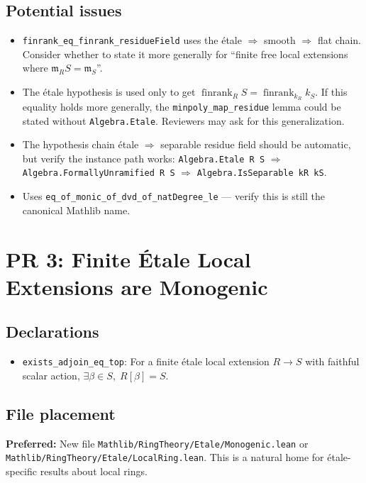 \subsection*{Potential issues}
\begin{itemize}
  \item \texttt{finrank\_eq\_finrank\_residueField} uses the étale
    $\Rightarrow$ smooth $\Rightarrow$ flat chain. Consider whether to state it more generally for
    ``finite free local extensions where $\mathfrak{m}_R S = \mathfrak{m}_S$''.
  \item The étale hypothesis is used only to get
    $\operatorname{finrank}_R S = \operatorname{finrank}_{k_R} k_S$.
    If this equality holds more generally, the \texttt{minpoly\_map\_residue} lemma
    could be stated without \texttt{Algebra.Etale}. Reviewers may ask for
    this generalization.
  \item The hypothesis chain étale $\Rightarrow$ separable residue field
    should be automatic, but verify the instance path works:
    \texttt{Algebra.Etale R S} $\Rightarrow$
    \texttt{Algebra.FormallyUnramified R S} $\Rightarrow$
    \texttt{Algebra.IsSeparable kR kS}.
  \item Uses \texttt{eq\_of\_monic\_of\_dvd\_of\_natDegree\_le} --- verify
    this is still the canonical Mathlib name.
\end{itemize}


\section{PR 3: Finite \'Etale Local Extensions are Monogenic}
\label{sec:pr3}

\subsection*{Declarations}

\begin{itemize}
  \item \texttt{exists\_adjoin\_eq\_top}: For a finite étale local extension
    $R \to S$ with faithful scalar action,
    $\exists \beta \in S,\; R[\beta] = S$.
\end{itemize}

\subsection*{File placement}

\textbf{Preferred:} New file \texttt{Mathlib/RingTheory/Etale/Monogenic.lean}
or \texttt{Mathlib/RingTheory/Etale/LocalRing.lean}.
This is a natural home for étale-specific results about local rings.

